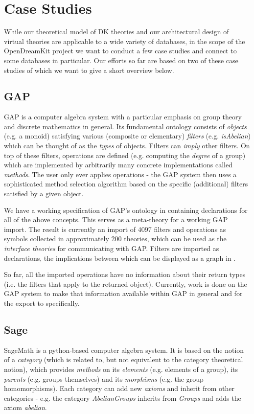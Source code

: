 \section{Case Studies}\label{sec:cases}

While our theoretical model of DK theories and our architectural design of virtual
theories are applicable to a wide variety of databases, in the scope of the OpenDreamKit
project we want to conduct a few case studies and connect to some databases in
particular. Our efforts so far are based on two of these case studies of which we want to
give a short overview below.

\subsection{GAP}\label{sec:gap}
GAP \cite{gap} is a computer algebra system with a particular emphasis on group theory and discrete mathematics in general. Its fundamental
ontology consists of \emph{objects} (e.g. a monoid) satisfying various (composite or elementary) \emph{filters} (e.g. \emph{isAbelian}) which
can be thought of as the \emph{types} of objects. Filters can \emph{imply} other filters.
On top of these filters, operations are defined (e.g. computing the \emph{degree} of a group) which are implemented by arbitrarily many concrete implementations
called \emph{methods}. The user only ever applies operations - the GAP system then uses a sophisticated method selection algorithm based on
the specific (additional) filters satisfied by a given object.

We have a working specification of GAP's ontology in \MMT containing declarations for all of the above concepts. This serves as a meta-theory for a working GAP import. The result is currently an import
of 4097 filters and operations as \MMT symbols collected in approximately 200 theories, which can be used as the \emph{interface theories} for communicating with GAP. Filters
are imported as \MMT declarations, the implications between which can be displayed as a graph in \MMT.

So far, all the imported operations have no information about their return types (i.e. the filters that apply to the returned object). Currently, work is done
on the GAP system to make that information available within GAP in general and for the export to \MMT specifically.

\subsection{Sage}\label{sec:sage}
SageMath is a python-based computer algebra system. It is based on the notion of a \emph{category} (which is related to, but not equivalent to the category theoretical notion),
which provides \emph{methods} on its \emph{elements} (e.g. elements of a group), its \emph{parents} (e.g. groups themselves) and its \emph{morphisms}
(e.g. the group homomorphisms). Each category can add new \emph{axioms} and inherit from other categories - e.g. the category \emph{AbelianGroups} inherits from \emph{Groups} and adds the axiom \emph{abelian}.  

